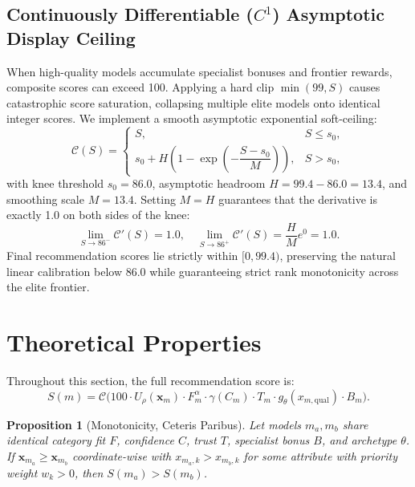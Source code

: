 \documentclass[pdflatex,sn-mathphys-num]{sn-jnl}
\theoremstyle{thmstyleone}
\newtheorem{proposition}{Proposition}
\theoremstyle{thmstylethree}
\begin{document}
\subsection{Continuously Differentiable ($C^1$) Asymptotic Display Ceiling}\label{subsec:ceiling}

When high-quality models accumulate specialist bonuses and frontier rewards, composite scores can exceed 100. Applying a hard clip $\min(99, S)$ causes catastrophic score saturation, collapsing multiple elite models onto identical integer scores. We implement a smooth asymptotic exponential soft-ceiling:
\begin{equation}\label{eq:soft_ceiling}
\mathcal{C}(S) = \begin{cases}
S, & S \le s_0, \\[4pt]
s_0 + H \left( 1 - \exp\left( -\dfrac{S - s_0}{M} \right) \right), & S > s_0,
\end{cases}
\end{equation}
with knee threshold $s_0 = 86.0$, asymptotic headroom $H = 99.4 - 86.0 = 13.4$, and smoothing scale $M = 13.4$. Setting $M = H$ guarantees that the derivative is exactly 1.0 on both sides of the knee:
\begin{equation}\label{eq:c1_ceiling}
\lim_{S \to 86^-} \mathcal{C}'(S) = 1.0, \quad \lim_{S \to 86^+} \mathcal{C}'(S) = \frac{H}{M} e^0 = 1.0.
\end{equation}
Final recommendation scores lie strictly within $[0, 99.4)$, preserving the natural linear calibration below $86.0$ while guaranteeing strict rank monotonicity across the elite frontier.

\section{Theoretical Properties}\label{sec:theory}

Throughout this section, the full recommendation score is:
\begin{equation}
S(m) = \mathcal{C}\Big( 100 \cdot U_\rho(\mathbf{x}_m) \cdot F_m^\alpha \cdot \gamma(C_m) \cdot T_m \cdot g_\theta(x_{m, \text{qual}}) \cdot B_m \Big).
\end{equation}

\begin{proposition}[Monotonicity, Ceteris Paribus]\label{prop:monotonicity}
Let models $m_a, m_b$ share identical category fit $F$, confidence $C$, trust $T$, specialist bonus $B$, and archetype $\theta$. If $\mathbf{x}_{m_a} \ge \mathbf{x}_{m_b}$ coordinate-wise with $x_{m_a, k} > x_{m_b, k}$ for some attribute with priority weight $w_k > 0$, then $S(m_a) > S(m_b)$.
\end{proposition}
\end{document}
